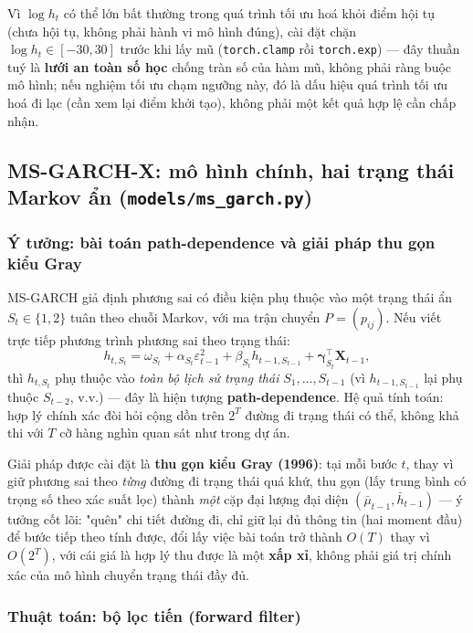\documentclass[11pt,a4paper]{article}
\newcommand{\code}[1]{\texttt{#1}}
\newcommand{\file}[1]{\texttt{#1}}
\begin{document}
Vì $\log h_t$ có thể lớn bất thường trong quá trình tối ưu hoá khỏi điểm hội tụ (chưa
hội tụ, không phải hành vi mô hình đúng), cài đặt chặn $\log h_t \in [-30, 30]$ trước
khi lấy mũ (\code{torch.clamp} rồi \code{torch.exp}) --- đây thuần tuý là \textbf{lưới
an toàn số học} chống tràn số của hàm mũ, không phải ràng buộc mô hình; nếu nghiệm
tối ưu chạm ngưỡng này, đó là dấu hiệu quá trình tối ưu hoá đi lạc (cần xem lại điểm
khởi tạo), không phải một kết quả hợp lệ cần chấp nhận.

\subsection{MS-GARCH-X: mô hình chính, hai trạng thái Markov ẩn (\file{models/ms\_garch.py})}
\label{sec:ms-garch-x}

\subsubsection{Ý tưởng: bài toán path-dependence và giải pháp thu gọn kiểu Gray}

MS-GARCH giả định phương sai có điều kiện phụ thuộc vào một trạng thái ẩn $S_t \in
\{1,2\}$ tuân theo chuỗi Markov, với ma trận chuyển $P=(p_{ij})$. Nếu viết trực tiếp
phương trình phương sai theo trạng thái:
\begin{equation}
h_{t,S_t} = \omega_{S_t} + \alpha_{S_t}\varepsilon_{t-1}^2 + \beta_{S_t}
h_{t-1,S_{t-1}} + \boldsymbol\gamma_{S_t}^\top \mathbf X_{t-1},
\end{equation}
thì $h_{t,S_t}$ phụ thuộc vào \emph{toàn bộ lịch sử trạng thái} $S_1,\dots,S_{t-1}$
(vì $h_{t-1,S_{t-1}}$ lại phụ thuộc $S_{t-2}$, v.v.) --- đây là hiện tượng
\textbf{path-dependence}. Hệ quả tính toán: hợp lý chính xác đòi hỏi cộng dồn trên
$2^T$ đường đi trạng thái có thể, không khả thi với $T$ cỡ hàng nghìn quan sát như
trong dự án.

Giải pháp được cài đặt là \textbf{thu gọn kiểu Gray (1996)}: tại mỗi bước $t$, thay
vì giữ phương sai theo \emph{từng} đường đi trạng thái quá khứ, thu gọn (lấy trung
bình có trọng số theo xác suất lọc) thành \emph{một} cặp đại lượng đại diện
$(\bar\mu_{t-1}, \bar h_{t-1})$ --- ý tưởng cốt lõi: "quên" chi tiết đường đi, chỉ giữ
lại đủ thông tin (hai moment đầu) để bước tiếp theo tính được, đổi lấy việc bài toán
trở thành $O(T)$ thay vì $O(2^T)$, với cái giá là hợp lý thu được là một \textbf{xấp
xỉ}, không phải giá trị chính xác của mô hình chuyển trạng thái đầy đủ.

\subsubsection{Thuật toán: bộ lọc tiến (forward filter)}
\end{document}
